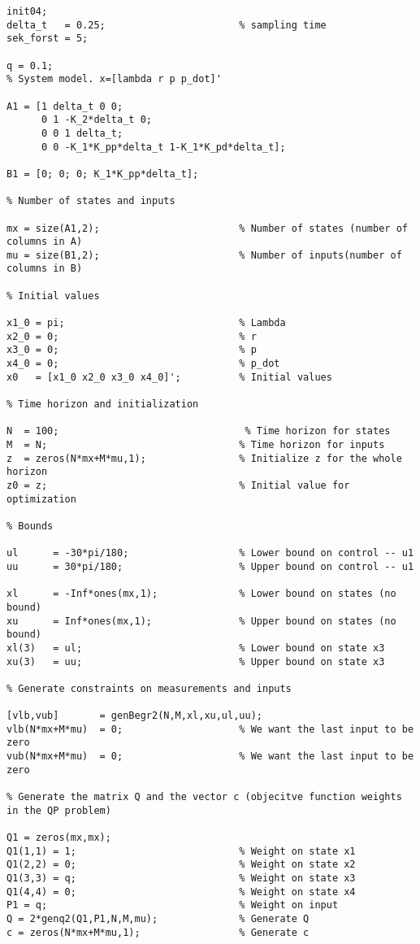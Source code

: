 \begin{lstlisting}
init04;
delta_t	  = 0.25;	                    % sampling time
sek_forst = 5;

q = 0.1;
% System model. x=[lambda r p p_dot]'

A1 = [1 delta_t 0 0;
      0 1 -K_2*delta_t 0;
      0 0 1 delta_t;
      0 0 -K_1*K_pp*delta_t 1-K_1*K_pd*delta_t];
  
B1 = [0; 0; 0; K_1*K_pp*delta_t];

% Number of states and inputs

mx = size(A1,2);                        % Number of states (number of columns in A)
mu = size(B1,2);                        % Number of inputs(number of columns in B)

% Initial values

x1_0 = pi;                              % Lambda
x2_0 = 0;                               % r
x3_0 = 0;                               % p
x4_0 = 0;                               % p_dot
x0   = [x1_0 x2_0 x3_0 x4_0]';          % Initial values

% Time horizon and initialization

N  = 100;                                % Time horizon for states
M  = N;                                 % Time horizon for inputs
z  = zeros(N*mx+M*mu,1);                % Initialize z for the whole horizon
z0 = z;                                 % Initial value for optimization

% Bounds

ul 	    = -30*pi/180;                   % Lower bound on control -- u1
uu 	    = 30*pi/180;                    % Upper bound on control -- u1

xl      = -Inf*ones(mx,1);              % Lower bound on states (no bound)
xu      = Inf*ones(mx,1);               % Upper bound on states (no bound)
xl(3)   = ul;                           % Lower bound on state x3
xu(3)   = uu;                           % Upper bound on state x3

% Generate constraints on measurements and inputs

[vlb,vub]       = genBegr2(N,M,xl,xu,ul,uu);
vlb(N*mx+M*mu)  = 0;                    % We want the last input to be zero
vub(N*mx+M*mu)  = 0;                    % We want the last input to be zero

% Generate the matrix Q and the vector c (objecitve function weights in the QP problem) 

Q1 = zeros(mx,mx);
Q1(1,1) = 1;                            % Weight on state x1
Q1(2,2) = 0;                            % Weight on state x2
Q1(3,3) = q;                            % Weight on state x3
Q1(4,4) = 0;                            % Weight on state x4
P1 = q;                                 % Weight on input
Q = 2*genq2(Q1,P1,N,M,mu);              % Generate Q
c = zeros(N*mx+M*mu,1);                 % Generate c


\end{lstlisting}

